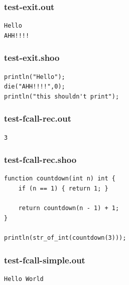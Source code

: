 \documentclass[12pt]{article}
\begin{document}
\subsubsection{test-exit.out}
\begin{mdframed}[hidealllines=true,backgroundcolor=green!10]
\begin{lstlisting}
Hello
AHH!!!!\end{lstlisting}
\end{mdframed}
\subsubsection{test-exit.shoo}
\begin{mdframed}[hidealllines=true,backgroundcolor=blue!10]
\begin{lstlisting}
println("Hello");
die("AHH!!!!",0);
println("this shouldn't print");\end{lstlisting}
\end{mdframed}
\subsubsection{test-fcall-rec.out}
\begin{mdframed}[hidealllines=true,backgroundcolor=green!10]
\begin{lstlisting}
3\end{lstlisting}
\end{mdframed}
\subsubsection{test-fcall-rec.shoo}
\begin{mdframed}[hidealllines=true,backgroundcolor=blue!10]
\begin{lstlisting}
function countdown(int n) int {
    if (n == 1) { return 1; }
    
    return countdown(n - 1) + 1;
}

println(str_of_int(countdown(3)));
\end{lstlisting}
\end{mdframed}
\subsubsection{test-fcall-simple.out}
\begin{mdframed}[hidealllines=true,backgroundcolor=green!10]
\begin{lstlisting}
Hello World
\end{lstlisting}
\end{mdframed}
\end{document}
